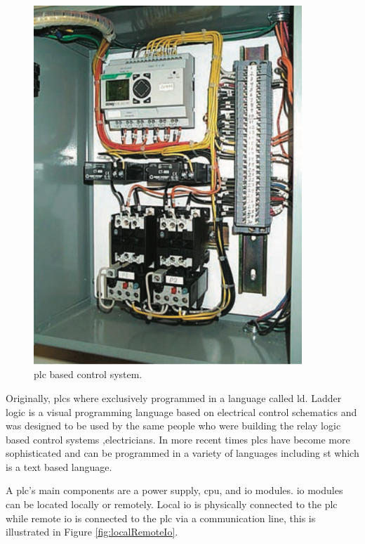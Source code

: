 \begin{figure}[H]
\begin{minipage}{0.35\textwidth}
        \includegraphics[width = 0.9\textwidth]{2_images/plcLogic.png}
        \caption{\acrshort{plc} based control system.~\cite{petruzella2017programmable}}
        \label{fig:plcLogic}
    \end{minipage}\hfill            
    \end{figure}   
    
    Originally, \acrshort{plc}s where exclusively programmed in a language called \acrfull{ld}\cite{petruzella2017programmable}. Ladder logic is a visual programming language based on electrical control schematics and was designed to be used by the same people who were building the relay logic based control systems ,electricians\cite{petruzella2017programmable}. In more recent times \acrshort{plc}s have become more sophisticated and can be programmed in a variety of languages including \acrfull{st} which is a text based language\cite{petruzella2017programmable}. 
    
    A \acrshort{plc}'s main components are a power supply, \acrlong{cpu}, and \acrshort{io} modules. \acrshort{io} modules can be located locally or remotely. Local \acrshort{io} is physically connected to the \acrshort{plc} while remote \acrshort{io} is connected to the \acrshort{plc} via a communication line, this is illustrated in Figure \ref{fig:localRemoteIo}.
       
